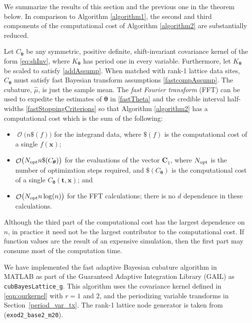 \documentclass{svjour3}                     %
\DeclareMathOperator{\Order}{{\mathcal O}}
\newcommand{\bm}[1]{\boldsymbol{#1}}
\newcommand{\vtheta}{{\bm{\theta}}}
\newcommand{\vC}{\bm{C}}
\newcommand{\vt}{\bm{t}}
\newcommand{\vx}{\bm{x}}
\newcommand{\opt}{{\textup{opt}}}
\newcommand{\hmu}{\widehat{\mu}}
\newcommand{\code}[1]{\texttt{#1}}
\newcommand\secref{Section~\ref}
\begin{document}
We summarize the results of this section and the previous one in the theorem below.  In comparison to Algorithm \ref{algorithm1}, the second and third components of the computational cost of Algorithm  \ref{algorithm2} are substantially reduced.
\begin{theorem}
Let $C_\vtheta$ be any symmetric, positive definite,  shift-invariant covariance kernel of the form \eqref{eq:shInv}, where $K_\vtheta$ has period one in every variable.  Furthermore, let $K_\vtheta$ be scaled to satisfy \eqref{addAssump}.  When matched with rank-1 lattice data sites, $C_\vtheta$ must satisfy fast Bayesian transform assumptions \eqref{fastcompAssump}.  The cubature, $\hmu$, is just the sample mean.  The \emph{fast Fourier transform} (FFT) can be used to expedite the estimates of $\vtheta$ in \eqref{fastTheta} and the credible interval half-widths \eqref{fastStoppingCriterions} so that Algorithm \ref{algorithm2} has a computational cost which is the sum of the following:
\begin{itemize}
	\item $\Order\bigl(n\$(f) \bigr)$ for the integrand data, where $\$(f)$ is the computational cost of a single $f(\vx)$;
	
	\item $\Order\bigl(N_{\opt} n \$(C_\vtheta) \bigr)$ for the evaluations of the vector $\vC_{1}$, where $N_\opt$ is the number of optimization steps required, and  $\$(C_\vtheta)$ is the computational cost of a single $C_\vtheta(\vt,\vx)$; and
	
	\item $\Order\bigl(N_{\opt} n \log(n) \bigr)$ for the FFT calculations; there is no $d$ dependence in these calculations.
	
\end{itemize}

\end{theorem}

Although the third part of the computational cost has the largest dependence on $n$, in practice it need not be the largest contributor to the computational cost.  If function values are the result of an expensive simulation, then the first part may consume most of the computation time.

We have implemented the fast adaptive Bayesian cubature algorithm in MATLAB as part of the Guaranteed Adaptive Integration Library (GAIL) \cite{ChoEtal17b} as  \code{cubBayesLattice\_g}. This algorithm uses the covariance kernel defined in \eqref{eqn:ourkernel} with  $r=1$ and $2$, and the periodizing variable transforms in  \secref{period_var_tx}.  The rank-1 lattice node generator is taken from \cite{Nuy17a}  (\code{exod2\_base2\_m20}).
\end{document}
